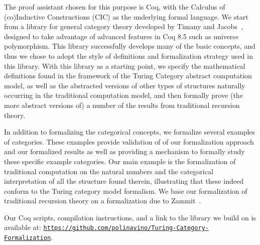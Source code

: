 \documentclass{entcs} \usepackage{entcsmacro}
\begin{document}
The proof assistant chosen for this purpose is Coq, with the Calculus
of (co)\-In\-duc\-tive Constructions (CIC) as the underlying formal
language.  We start from a library for general category theory
developed by Timany and Jacobs~\cite{timanyNewLib}, designed to take
advantage of advanced features in Coq 8.5 such as universe
polymorphism.  This library successfully develops many of the basic
concepts, and thus we chose to adopt the style of definitions and
formalization strategy used in this library.  With this library as a
starting point, we specify the mathematical definitions found in the
framework of the Turing Category abstract computation model, as well
as the abstracted versions of other types of structures naturally
occurring in the traditional computation model, and then formally
prove (the more abstract versions of) a number of the results from
traditional recursion theory.


In addition to formalizing the categorical concepts, we formalize
several examples of categories. These examples provide validation of
of our formalization approach and our formalized results as well as
providing a mechanism to formally study these specific example
categories. Our main example is the formalization of traditional
computation on the natural numbers and the categorical interpretation
of all the structure found therein, illustrating that these indeed
conform to the Turing category model formalism. We base our
formalization of traditional recursion theory on a formalization due
to Zammit~\cite{SmnForm}.

Our Coq scripts, compilation instructions, and a link to the library
we build on is available at:
\href{https://github.com/polinavino/Turing-Category-Formalization}
{\texttt{https://github.com/polinavino/Turing-Category-Formalization}}.
\end{document}
